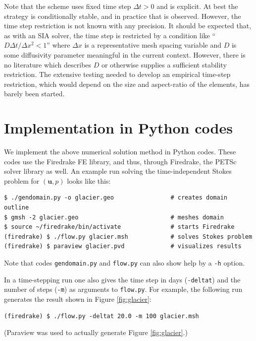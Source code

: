 \documentclass[letterpaper,final,12pt,reqno]{amsart}
\newcommand{\bu}{\mathbf{u}}
\begin{document}
Note that the scheme uses fixed time step $\Delta t > 0$ and is explicit.  At best the strategy is conditionally stable, and in practice that is observed.  However, the time step restriction is not known with any precision.  It should be expected that, as with an SIA solver, the time step is restricted by a condition like ``$D\Delta t / \Delta x^2 < 1$'' where $\Delta x$ is a representative mesh spacing variable and $D$ is some diffusivity parameter meaningful in the current context.  However, there is no literature which describes $D$ or otherwise supplies a sufficient stability restriction.  The extensive testing needed to develop an empirical time-step restriction, which would depend on the size and aspect-ratio of the elements, has barely been started.


\section{Implementation in Python codes} \label{sec:implementation}

We implement the above numerical solution method in Python codes.  These codes use the Firedrake FE library, and thus, through Firedrake, the PETSc solver library as well.  An example run solving the time-independent Stokes problem for $(\bu,p)$ looks like this:

\medskip
\begin{Verbatim}
$ ./gendomain.py -o glacier.geo                # creates domain outline
$ gmsh -2 glacier.geo                          # meshes domain
$ source ~/firedrake/bin/activate              # starts Firedrake
(firedrake) $ ./flow.py glacier.msh            # solves Stokes problem
(firedrake) $ paraview glacier.pvd             # visualizes results
\end{Verbatim}

\medskip
\noindent Note that codes \texttt{gendomain.py} and \texttt{flow.py} can also show help by a \texttt{-h} option.

In a time-stepping run one also gives the time step in days (\texttt{-deltat}) and the number of steps (\texttt{-m}) as arguments to \texttt{flow.py}.  For example, the following run generates the result shown in Figure \ref{fig:glacier}:

\medskip
\begin{Verbatim}
(firedrake) $ ./flow.py -deltat 20.0 -m 100 glacier.msh
\end{Verbatim}

\medskip
\noindent (Paraview was used to actually generate Figure \ref{fig:glacier}.)
\end{document}
